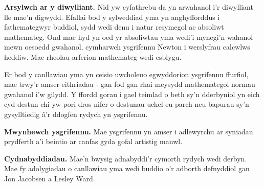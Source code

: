 \documentclass{article}
\begin{document}
\begin{multicols}{2}
\vspace{4mm}

\textbf{Arsylwch ar y diwylliant.}
Nid yw cyfathrebu da yn arwahanol i'r diwylliant lle mae'n digwydd.
Efallai bod y sylweddiad yma yn anghyfforddus i fathemategwyr buddiol, sydd wedi
denu i natur resymegol ac absoliwt mathemateg.
Ond mae hyd yn oed yr absoliwtau yma wedi'i mynegi'n wahanol mewn oesoedd
gwahanol, cymharwch ysgrifennu Newton i werslyfrau calcwlws heddiw.
Mae rheolau arferion mathemateg wedi esblygu.

Er bod y canllawiau yma yn ceisio uwcholeuo egwyddorion ysgrifennu ffurfiol, mae
trwy'r amser eithriadau - gan fod gan rhai meysydd mathemategol normau
gwahanol i'w gilydd.
Y ffordd gorau i gael teimlad o beth sy'n dderbyniol yn eich cyd-destun chi yw
pori dros nifer o destunau uchel eu parch neu bapurau sy'n gysylltiedig \^{a}'r
ddogfen rydych yn ysgrifennu.

\vspace{4mm}

\textbf{Mwynhewch ysgrifennu.}
Mae ysgrifennu yn amser i adlewyrchu ar syniadau prydferth a'i beintio ar canfas
gyda gofal artistig manwl.

\vspace{4mm}

\textbf{Cydnabyddiadau.}
Mae'n bwysig adnabyddi'r cymorth rydych wedi derbyn.
Mae fy adolygiadau o canllawiau yma wedi buddio o'r adborth defnyddiol gan Jon
Jacobsen a Lesley Ward.

\end{multicols}
\end{document}
